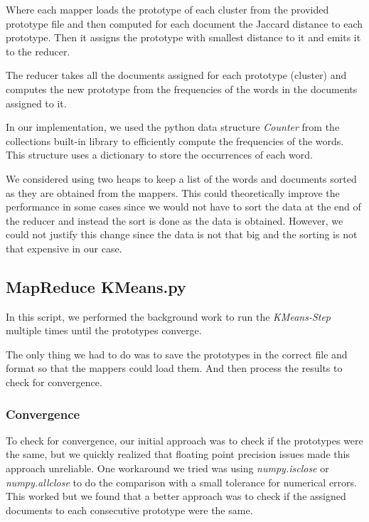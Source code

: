 Where each mapper loads the prototype of each cluster from the provided prototype file and then
computed for each document the Jaccard distance to each prototype. Then it assigns the
prototype with smallest distance to it and emits it to the reducer.

The reducer takes all the documents assigned for each prototype (cluster) and computes the
new prototype from the frequencies of the words in the documents assigned to it.

In our implementation, we used the python data structure \emph{Counter} from the
collections built-in library to efficiently compute the frequencies of the words. This
structure uses a dictionary to store the occurrences of each word.

We considered using two heaps to keep a list of the words and documents sorted as they
are obtained from the mappers. This could theoretically improve the performance
in some cases since we would not have to sort the data at the end of the reducer and
instead the sort is done as the data is obtained. However, we could not justify
this change since the data is not that big and the sorting is not that expensive in our case.

\subsection{MapReduce KMeans.py}

In this script, we performed the background work to run the \emph{KMeans-Step} multiple
times until the prototypes converge.

The only thing we had to do was to save the prototypes in the correct file and format
so that the mappers could load them. And then process the results to check for convergence.

\subsubsection{Convergence}

To check for convergence, our initial approach was to check if the prototypes were the same,
but we quickly realized that floating point precision issues made this approach unreliable.
One workaround we tried was using \emph{numpy.isclose} or \emph{numpy.allclose} to do the
comparison with a small tolerance for numerical errors. This worked but we found that a better
approach was to check if the assigned documents to each consecutive prototype were the same.

